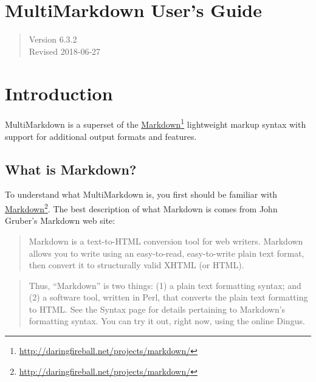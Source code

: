 
\def\mytitle{MultiMarkdown User's Guide}
\def\latextitle{MultiMarkdown \\ User's Guide}
\def\myauthor{Fletcher T. Penney}
\def\version{6.3.2}
\def\revised{2018-06-27}
\def\uuid{88e8f53c-9a02-4e49-a639-f2dbb0a2e338}




\chapter{MultiMarkdown User's Guide }
\label{title}

\begin{quote}
Version 6.3.2\\
Revised 2018-06-27
\end{quote}

\chapter{Introduction }
\label{introduction}

MultiMarkdown is a superset of the \href{http://daringfireball.net/projects/markdown/}{Markdown}\footnote{\href{http://daringfireball.net/projects/markdown/}{http:\slash \slash daringfireball.net\slash projects\slash markdown\slash }} lightweight markup syntax with support for additional output formats and features.

\section{What is Markdown? }
\label{whatismarkdown}

To understand what MultiMarkdown is, you first should be familiar with
\href{http://daringfireball.net/projects/markdown/}{Markdown}\footnote{\href{http://daringfireball.net/projects/markdown/}{http:\slash \slash daringfireball.net\slash projects\slash markdown\slash }}. The best description of what Markdown is comes from John Gruber's
Markdown web site:

\begin{quote}
Markdown is a text-to-HTML conversion tool for web writers. Markdown
allows you to write using an easy-to-read, easy-to-write plain text
format, then convert it to structurally valid XHTML (or HTML).
\end{quote}

\begin{quote}
Thus, ``Markdown'' is two things: (1) a plain text formatting
syntax; and (2) a software tool, written in Perl, that converts
the plain text formatting to HTML. See the Syntax page for details
pertaining to Markdown's formatting syntax. You can try it out,
right now, using the online Dingus.
\end{quote}

